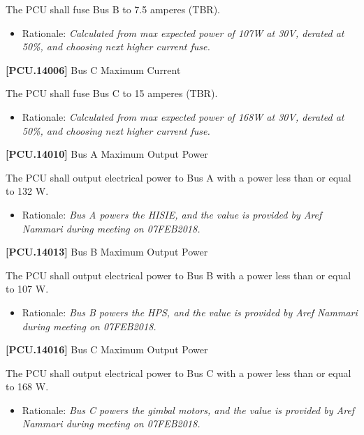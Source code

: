 \documentclass[12pt,oneside,oldfontcommands]{memoir}
\begin{document}
The \gls{PCU} shall fuse Bus B to 7.5 amperes (TBR\label{tbx_8}).

\begin{itemize}
\item{} Rationale: \emph{Calculated from max expected power of 107W at 30V, derated at 50\%, and choosing next higher current fuse.}

\end{itemize}

\textbf{[PCU.14006]} Bus C Maximum Current

The \gls{PCU} shall fuse Bus C to 15 amperes (TBR\label{tbx_9}).

\begin{itemize}
\item{} Rationale: \emph{Calculated from max expected power of 168W at 30V, derated at 50\%, and choosing next higher current fuse.}

\end{itemize}

\textbf{[PCU.14010]} Bus A Maximum Output Power

The \gls{PCU} shall output electrical power to Bus A with a power less than or equal to 132 W.

\begin{itemize}
\item{} Rationale: \emph{Bus A powers the HISIE, and the value is provided by Aref Nammari during meeting on 07FEB2018.}

\end{itemize}

\textbf{[PCU.14013]} Bus B Maximum Output Power

The \gls{PCU} shall output electrical power to Bus B with a power less than or equal to 107 W.

\begin{itemize}
\item{} Rationale: \emph{Bus B powers the HPS, and the value is provided by Aref Nammari during meeting on 07FEB2018.}

\end{itemize}

\textbf{[PCU.14016]} Bus C Maximum Output Power

The \gls{PCU} shall output electrical power to Bus C with a power less than or equal to 168 W.

\begin{itemize}
\item{} Rationale: \emph{Bus C powers the gimbal motors, and the value is provided by Aref Nammari during meeting on 07FEB2018.}

\end{itemize}
\end{document}
